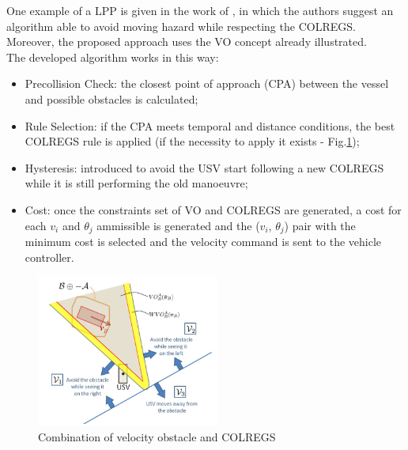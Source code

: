 \documentclass[12pt]{article}
\begin{document}
              One example of a LPP is given in the work of \textcite{Kuwata2014}, in which the authors suggest an algorithm able to avoid moving hazard while respecting the COLREGS. Moreover, the proposed approach uses the VO concept already illustrated.\\
              The developed algorithm works in this way:
                    \begin{itemize}
                          \item Precollision Check: the closest point of approach (CPA) between the vessel and possible obstacles is calculated;
                          \item Rule Selection: if the CPA meets temporal and distance conditions, the best COLREGS rule is applied (if the necessity to apply it exists - Fig.\ref{fig:vo_colregs});
                          \item Hysteresis: introduced to avoid the USV start following a new COLREGS while it is still performing the old manoeuvre;
                          \item Cost: once the constraints set of VO and COLREGS are generated, a cost for each \textit{$v_i$} and \textit{$\theta_j$} ammissible is generated and the (\textit{$v_i$}, \textit{$\theta_j$}) pair with the minimum cost is selected and the velocity command is sent to the vehicle controller.
                    \end{itemize}

                    \begin{figure}
                          \centering
                          \includegraphics[height=5cm]{./Images/Kuwata/vo_colregs}
                          \caption{Combination of velocity obstacle and COLREGS}
                          \label{fig:vo_colregs}
                    \end{figure}
\end{document}
